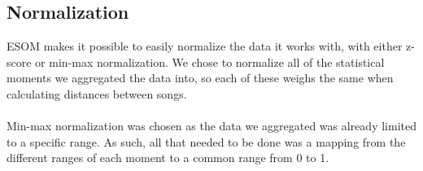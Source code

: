 \subsection{Normalization}
\label{sec:preprocessing_normalization}

ESOM makes it possible to easily normalize the data it works with, with either z-score or min-max normalization.
We chose to normalize all of the statistical moments we aggregated the data into, so each of these weighs
the same when calculating distances between songs.
\\\\
Min-max normalization was chosen as the data we aggregated was already limited to a specific range. As such, all
that needed to be done was a mapping from the different ranges of each moment to a common range from 0 to 1.